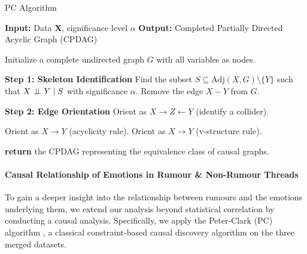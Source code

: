 \begin{algorithm}[ht!] 
\caption{PC Algorithm}
\label{pc}
\begin{algorithmic}[1] 
\State \textbf{Input:} Data $\mathbf{X}$, significance level $\alpha$
\State \textbf{Output:} Completed Partially Directed Acyclic Graph (CPDAG)

\State Initialize a complete undirected graph $G$ with all variables as nodes.

\State \textbf{Step 1: Skeleton Identification}
    \State Find the subset $S \subseteq \text{Adj}(X, G) \setminus \{Y\}$ such that 
    $X \perp\!\!\!\perp Y \mid S$ with significance $\alpha$.
        \State Remove the edge $X - Y$ from $G$.
    \EndIf
\EndFor

\State \textbf{Step 2: Edge Orientation}
        \State Orient as $X \to Z \leftarrow Y$ (identify a collider).
    \EndIf
\EndFor

            \State Orient as $X \to Y$ (acyclicity rule).
            \State Orient as $X \to Y$ (v-structure rule).
        \EndIf
    \EndFor
\EndWhile

\State \textbf{return} the CPDAG representing the equivalence class of causal graphs.


\end{algorithmic}
\end{algorithm}


\paragraph{Causal Relationship of Emotions in Rumour \& Non-Rumour Threads}
To gain a deeper insight into the relationship between rumours and the emotions underlying them, we extend our analysis beyond statistical correlation by conducting a causal analysis. Specifically, we apply the Peter-Clark (PC) algorithm \cite{Spirtes2000}, a classical constraint-based causal discovery algorithm on the three merged datasets. 

